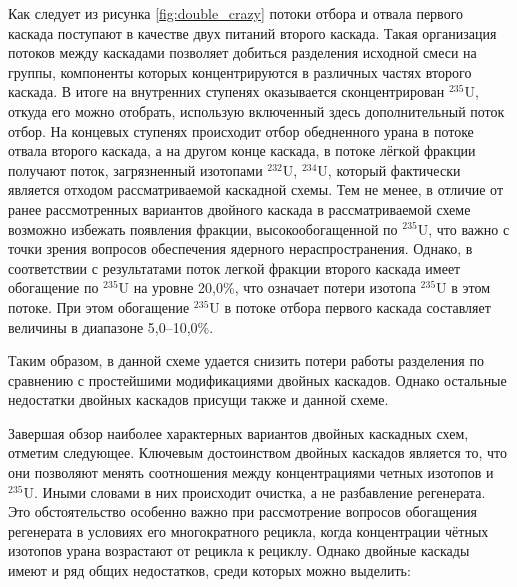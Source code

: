 Как следует из рисунка \ref{fig:double_crazy} потоки отбора и отвала первого каскада поступают в качестве двух питаний второго каскада. Такая организация потоков между каскадами позволяет добиться разделения исходной смеси на группы, компоненты которых концентрируются в различных частях второго каскада. В итоге на внутренних ступенях оказывается сконцентрирован $^{235}$U, откуда его можно отобрать, использую включенный здесь дополнительный поток отбор. На концевых ступенях происходит отбор обедненного урана в потоке отвала второго каскада, а на другом конце каскада, в потоке лёгкой фракции получают поток, загрязненный изотопами $^{232}$U, $^{234}$U, который фактически является отходом рассматриваемой каскадной схемы. Тем не менее, в отличие от ранее рассмотренных вариантов двойного каскада в рассматриваемой схеме возможно избежать появления фракции, высокообогащенной по $^{235}$U, что важно с точки зрения вопросов обеспечения ядерного нераспространения. Однако, в соответствии с результатами \cite{SposobIzotopnogoVosstanovleniyac} поток легкой фракции второго каскада имеет обогащение по $^{235}$U на уровне 20,0\%, что означает потери изотопа $^{235}$U в этом потоке. При этом обогащение $^{235}$U в потоке отбора первого каскада составляет величины в диапазоне 5,0--10,0\%.
 
Таким образом, в данной схеме удается снизить потери работы разделения по сравнению с простейшими модификациями двойных каскадов. Однако остальные недостатки двойных каскадов присущи также и данной схеме. 

Завершая обзор наиболее характерных вариантов двойных каскадных схем, отметим следующее. 
Ключевым достоинством двойных каскадов является то, что они позволяют менять соотношения между концентрациями четных изотопов и $^{235}$U. Иными словами в них происходит очистка, а не разбавление регенерата. Это обстоятельство особенно важно при рассмотрение вопросов обогащения регенерата в условиях его многократного рецикла, когда концентрации чётных изотопов урана возрастают от рецикла к рециклу.
Однако двойные каскады имеют и ряд общих недостатков, среди которых можно выделить:

